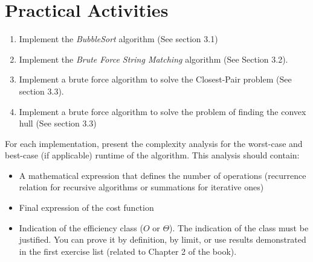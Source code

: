 \documentclass{article}
\begin{document}
\section{Practical Activities}

\begin{enumerate}
    \item Implement the \textit{BubbleSort} algorithm (See section 3.1)
    \item Implement the \textit{Brute Force String Matching} algorithm (See Section 3.2).
    \item Implement a brute force algorithm to solve the Closest-Pair problem (See section 3.3).
    \item Implement a brute force algorithm to solve the problem of finding the convex hull (See section 3.3)
\end{enumerate}

For each implementation, present the complexity analysis for the worst-case and best-case (if applicable) runtime of the algorithm. This analysis should contain:

\begin{itemize}
    \item A mathematical expression that defines the number of operations (recurrence relation for recursive algorithms or summations for iterative ones) 
    \item Final expression of the cost function
    \item Indication of the efficiency class ($O$ or $\Theta$). The indication of the class must be justified. You can prove it by definition, by limit, or use results demonstrated in the first exercise list (related to Chapter 2 of the book).
\end{itemize}




%
%
\end{document}
